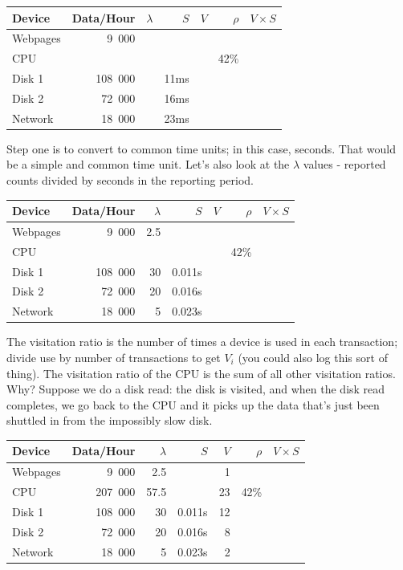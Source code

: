 \documentclass[a4paper]{report}
\begin{document}
\begin{center}
\begin{tabular}{l|r|r|r|r|r|r} 
	\textbf{Device} & \textbf{Data/Hour} & \textbf{$\lambda$} & \textbf{$S$} & \textbf{$V$} & \textbf{$\rho$} & \textbf{$V \times S$} \\ \hline
	Webpages & 9~000 & & & & & \\ \hline
	CPU & & & & &  42\% & \\ \hline
	Disk 1 & 108~000 & & 11ms & & &\\ \hline
	Disk 2 & 72~000 & & 16ms & & &\\ \hline
	Network & 18~000 & & 23ms & & &
\end{tabular}
\end{center}

Step one is to convert to common time units; in this case, seconds. That would be a simple and common time unit. Let's also look at the $\lambda$ values - reported counts divided by seconds in the reporting period.

\begin{center}
\begin{tabular}{l|r|r|r|r|r|r} 
	\textbf{Device} & \textbf{Data/Hour} & \textbf{$\lambda$} & \textbf{$S$} & \textbf{$V$} & \textbf{$\rho$} & \textbf{$V \times S$} \\ \hline
	Webpages & 9~000 & 2.5 & & & & \\ \hline
	CPU & & & & & 42\% & \\ \hline
	Disk 1 & 108~000 & 30 & 0.011s  & & &\\ \hline
	Disk 2 & 72~000 & 20 & 0.016s & & &\\ \hline
	Network & 18~000 & 5 & 0.023s & & &
\end{tabular}
\end{center}

The visitation ratio is the number of times a device is used in each transaction; divide use by number of transactions to get $V_{i}$ (you could also log this sort of thing). The visitation ratio of the CPU is the sum of all other visitation ratios. Why? Suppose we do a disk read: the disk is visited, and when the disk read completes, we go back to the CPU and it picks up the data that's just been shuttled in from the impossibly slow disk.

\begin{center}
\begin{tabular}{l|r|r|r|r|r|r} 
	\textbf{Device} & \textbf{Data/Hour} & \textbf{$\lambda$} & \textbf{$S$} & \textbf{$V$} & \textbf{$\rho$} & \textbf{$V \times S$} \\ \hline
	Webpages & 9~000 & 2.5 & & 1 & & \\ \hline
	CPU & 207~000 & 57.5 &  & 23 & 42\% & \\ \hline
	Disk 1 & 108~000 & 30 & 0.011s  & 12& &\\ \hline
	Disk 2 & 72~000 & 20 & 0.016s & 8 & &\\ \hline
	Network & 18~000 & 5 & 0.023s & 2 & &
\end{tabular}
\end{center}
\end{document}
